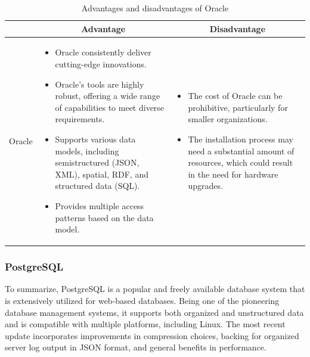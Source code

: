 \begin{table}[H]
    \centering
    \begin{tabular}{| c | p{} | p{} |}
        \hline
        \multicolumn{1}{|c|}{}
        & \multicolumn{1}{c|}{Advantage}
        & \multicolumn{1}{c|}{Disadvantage} \\ \hline
        \multirow{7}{*}{Oracle}     
                &   \begin{itemize}[leftmargin=*,topsep=0pt,partopsep=0pt,parsep=0pt]
                        \item Oracle consistently deliver cutting-edge innovations.
                        \item Oracle's tools are highly robust, offering a wide range of capabilities to meet diverse requirements.
                        \item Supports various data models, including semistructured (JSON, XML), spatial, RDF, and structured data (SQL).
                        \item Provides multiple access patterns based on the data model.
                    \end{itemize}
                &   \begin{itemize}[leftmargin=*,topsep=0pt,partopsep=0pt,parsep=0pt]
                        \item The cost of Oracle can be prohibitive, particularly for smaller organizations.
                        \item The installation process may need a substantial amount of resources, which could result in the need for hardware upgrades.
                    \end{itemize} \\ \hline
    \end{tabular}
    \caption{Advantages and disadvantages of Oracle}
\end{table}

\subsubsection{PostgreSQL}

To summarize, PostgreSQL is a popular and freely available database system that is extensively utilized for web-based databases. Being one of the pioneering database management systems, it supports both organized and unstructured data and is compatible with multiple platforms, including Linux. The most recent update incorporates improvements in compression choices, backing for organized server log output in JSON format, and general benefits in performance.

